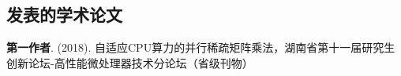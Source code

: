 \begin{resume}

  \section*{发表的学术论文} %

  \begin{enumerate}[label={[\arabic*]}]
  \addtolength{\itemsep}{-.36\baselineskip}%
  \item \textbf{第一作者}. (2018). 自适应CPU算力的并行稀疏矩阵乘法，湖南省第十一届研究生创新论坛-高性能微处理器技术分论坛（省级刊物）
  \end{enumerate}
\end{resume}